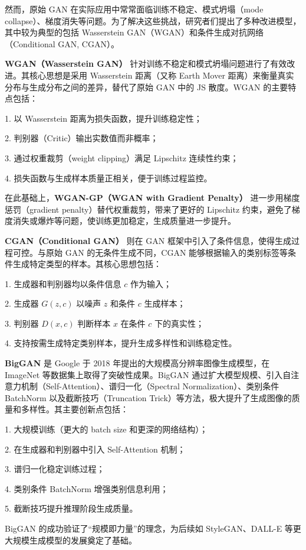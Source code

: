 \documentclass[12pt, a4paper]{article}
\begin{document}
然而，原始 GAN 在实际应用中常常面临训练不稳定、模式坍塌（mode collapse）、梯度消失等问题。为了解决这些挑战，研究者们提出了多种改进模型，其中较为典型的包括 Wasserstein GAN（WGAN）和条件生成对抗网络（Conditional GAN, CGAN）。

\textbf{WGAN（Wasserstein GAN）} 针对训练不稳定和模式坍塌问题进行了有效改进。其核心思想是采用 Wasserstein 距离（又称 Earth Mover 距离）来衡量真实分布与生成分布之间的差异，替代了原始 GAN 中的 JS 散度。WGAN 的主要特点包括：

1. 以 Wasserstein 距离为损失函数，提升训练稳定性；

2. 判别器（Critic）输出实数值而非概率；

3. 通过权重裁剪（weight clipping）满足 Lipschitz 连续性约束；

4. 损失函数与生成样本质量正相关，便于训练过程监控。

在此基础上，\textbf{WGAN-GP（WGAN with Gradient Penalty）} 进一步用梯度惩罚（gradient penalty）替代权重裁剪，带来了更好的 Lipschitz 约束，避免了梯度消失或爆炸等问题，使训练更加稳定，生成质量进一步提升。

\textbf{CGAN（Conditional GAN）} 则在 GAN 框架中引入了条件信息，使得生成过程可控。与原始 GAN 的无条件生成不同，CGAN 能够根据输入的类别标签等条件生成特定类型的样本。其核心思想包括：

1. 生成器和判别器均以条件信息 $c$ 作为输入；

2. 生成器 $G(z, c)$ 以噪声 $z$ 和条件 $c$ 生成样本；

3. 判别器 $D(x, c)$ 判断样本 $x$ 在条件 $c$ 下的真实性；

4. 支持按需生成特定类别样本，提升生成多样性和训练稳定性。

\textbf{BigGAN} 是 Google 于 2018 年提出的大规模高分辨率图像生成模型，在 ImageNet 等数据集上取得了突破性成果。BigGAN 通过扩大模型规模、引入自注意力机制（Self-Attention）、谱归一化（Spectral Normalization）、类别条件 BatchNorm 以及截断技巧（Truncation Trick）等方法，极大提升了生成图像的质量和多样性。其主要创新点包括：

1. 大规模训练（更大的 batch size 和更深的网络结构）；

2. 在生成器和判别器中引入 Self-Attention 机制；

3. 谱归一化稳定训练过程；

4. 类别条件 BatchNorm 增强类别信息利用；

5. 截断技巧提升推理阶段生成质量。

BigGAN 的成功验证了“规模即力量”的理念，为后续如 StyleGAN、DALL-E 等更大规模生成模型的发展奠定了基础。
\end{document}
